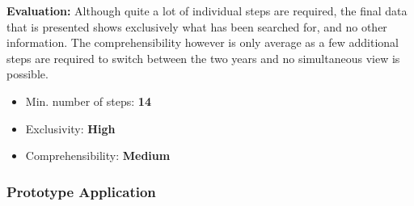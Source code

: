 \textbf{Evaluation:}  Although quite a lot of individual steps are required, the final data that is presented shows exclusively what has been searched for, and no other information. The comprehensibility however is only average as a few additional steps are required to switch between the two years and no simultaneous view is possible. 
\begin{itemize}[noitemsep,nolistsep]
	\item Min. number of steps: \textbf{14}
	\item Exclusivity: \textbf{High}
	\item Comprehensibility: \textbf{Medium}
\end{itemize}



\subsubsection{Prototype Application}

